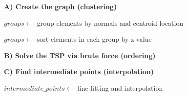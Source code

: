 \begin{algorithm}[t]
\caption{Wind Turbine Specific Path Planner}
\label{alg:wind_turbine_planner}


\BlankLine

\textbf{A) Create the graph (clustering)}\;

$groups \gets$ group elements by normals and centroid location\;

$groups \gets$ sort elements in each group by z-value\;

\BlankLine

\textbf{B) Solve the TSP via brute force (ordering)}\;


\BlankLine

\textbf{C) Find intermediate points (interpolation)}\;

$intermediate\_points \gets$ line fitting and interpolation\;

\end{algorithm}







